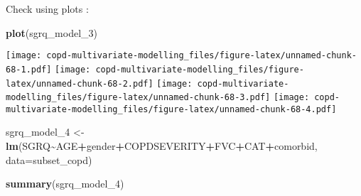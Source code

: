 \documentclass[
]{article}
\newenvironment{Shaded}{\begin{snugshade}}{\end{snugshade}}
\newcommand{\AttributeTok}[1]{\textcolor[rgb]{0.13,0.29,0.53}{#1}}
\newcommand{\FunctionTok}[1]{\textcolor[rgb]{0.13,0.29,0.53}{\textbf{#1}}}
\newcommand{\NormalTok}[1]{#1}
\newcommand{\OtherTok}[1]{\textcolor[rgb]{0.56,0.35,0.01}{#1}}
\newcommand{\SpecialCharTok}[1]{\textcolor[rgb]{0.81,0.36,0.00}{\textbf{#1}}}
\begin{document}
Check using plots :

\begin{Shaded}
\begin{Highlighting}[]
\FunctionTok{plot}\NormalTok{(sgrq\_model\_3)}
\end{Highlighting}
\end{Shaded}

\texttt{[image: copd-multivariate-modelling\_files/figure-latex/unnamed-chunk-68-1.pdf]}
\texttt{[image: copd-multivariate-modelling\_files/figure-latex/unnamed-chunk-68-2.pdf]}
\texttt{[image: copd-multivariate-modelling\_files/figure-latex/unnamed-chunk-68-3.pdf]}
\texttt{[image: copd-multivariate-modelling\_files/figure-latex/unnamed-chunk-68-4.pdf]}

\begin{Shaded}
\begin{Highlighting}[]
\NormalTok{sgrq\_model\_4 }\OtherTok{\textless{}{-}} \FunctionTok{lm}\NormalTok{(SGRQ}\SpecialCharTok{\textasciitilde{}}\NormalTok{AGE}\SpecialCharTok{+}\NormalTok{gender}\SpecialCharTok{+}\NormalTok{COPDSEVERITY}\SpecialCharTok{+}\NormalTok{FVC}\SpecialCharTok{+}\NormalTok{CAT}\SpecialCharTok{+}\NormalTok{comorbid, }\AttributeTok{data=}\NormalTok{subset\_copd)}
\end{Highlighting}
\end{Shaded}

\begin{Shaded}
\begin{Highlighting}[]
\FunctionTok{summary}\NormalTok{(sgrq\_model\_4)}
\end{Highlighting}
\end{Shaded}
\end{document}
